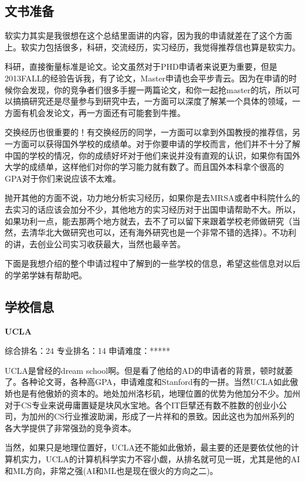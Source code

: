 \subsection{文书准备}
软实力其实是我很想在这个总结里面讲的内容，因为我的申请就差在了这个方面上。软实力包括很多，科研，交流经历，实习经历，我觉得推荐信也算是软实力。\par

科研，直接衡量标准是论文。论文虽然对于PHD申请者来说更为重要，但是2013FALL的经验告诉我，有了论文，Master申请也会平步青云。因为在申请的时候你会发现，你的竞争者们很多手握一两篇论文，和你一起抢master的坑，所以可以搞搞研究还是尽量参与到研究中去，一方面可以深度了解某一个具体的领域，一方面有机会发论文，再一方面还有可能套到牛推。\par

交换经历也很重要的！有交换经历的同学，一方面可以拿到外国教授的推荐信，另一方面可以获得国外学校的成绩单。对于你要申请的学校而言，他们并不十分了解中国的学校的情况，你的成绩好坏对于他们来说并没有直观的认识，如果你有国外大学的成绩单，这样他们对你的学习能力就有数了。而且国外本科拿个很高的GPA对于你们来说应该不太难。\par

抛开其他的方面不说，功力地分析实习经历，如果你是去MRSA或者中科院什么的去实习的话应该会加分不少，其他地方的实习经历对于出国申请帮助不大。所以，如果功利一点，能去那两个地方就去，去不了可以留下来跟着学校老师做研究（当然，去清华北大做研究也可以，还有海外研究也是一个非常不错的选择）。不功利的讲，去创业公司实习收获最大，当然也最辛苦。\par

下面是我想介绍的整个申请过程中了解到的一些学校的信息，希望这些信息对以后的学弟学妹有帮助吧。

\subsection{学校信息}
\textbf{UCLA}\par
综合排名：24 专业排名：14 申请难度：***** \par

UCLA是曾经的dream school啊。但是看了他给的AD的申请者的背景，顿时就萎了。各种论文哥，各种高GPA，申请难度和Stanford有的一拼。当然UCLA如此傲娇也是有他傲娇的资本的。地处加州洛杉矶，地理位置的优势为他加分不少。加州对于CS专业来说毋庸置疑是块风水宝地。各个IT巨擘还有数不胜数的创业小公司，为加州的CS行业推波助澜，形成了一片祥和的景致。因此这也为加州系列的各大学提供了非常强劲的竞争资本。\par

当然，如果只是地理位置好，UCLA还不能如此傲娇，最主要的还是要依仗他的计算机实力，UCLA的计算机科学实力不容小觑，从排名就可见一斑，尤其是他的AI和ML方向，非常之强(AI和ML也是现在很火的方向之二)。\par


